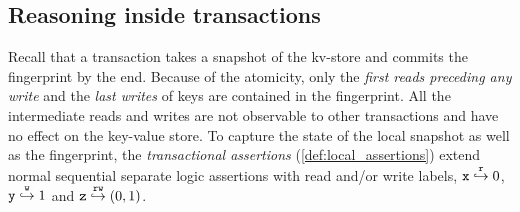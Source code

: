 \subsection{Reasoning inside transactions}
\label{sec:reasoning-transaction}

Recall that a transaction takes a snapshot of the kv-store and commits the fingerprint by the end.
Because of the atomicity, only the \emph{first reads preceding any write} and the \emph{last writes} of keys are contained in the fingerprint.
All the intermediate reads and writes are not observable to other transactions and have no effect on the key-value store.
To capture the state of the local snapshot as well as the fingerprint, 
the \emph{transactional assertions} (\cref{def:local_assertions}) extend normal sequential separate logic assertions with read and/or write labels, 
\eg \( \mathtt{x} \stackrel{\textnormal{\texttt r}}{\hookrightarrow} 0 \), \( \mathtt{y} \stackrel{\textnormal{\texttt w}}{\hookrightarrow} 1 \) and \( \mathtt{z} \stackrel{\textnormal{\texttt r}\textnormal{\texttt w}}{\hookrightarrow} (0,1) \).


